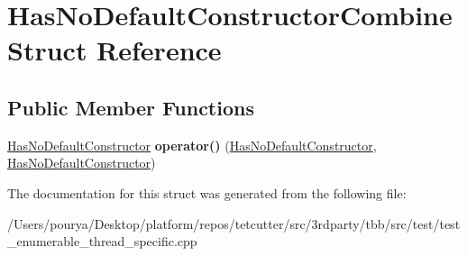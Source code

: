 \hypertarget{structHasNoDefaultConstructorCombine}{}\section{Has\+No\+Default\+Constructor\+Combine Struct Reference}
\label{structHasNoDefaultConstructorCombine}
\subsection*{Public Member Functions}
\begin{DoxyCompactItemize}
\item 
\hypertarget{structHasNoDefaultConstructorCombine_af7df6a0ef07191debb0e70a837667ac1}{}\hyperlink{classHasNoDefaultConstructor}{Has\+No\+Default\+Constructor} {\bfseries operator()} (\hyperlink{classHasNoDefaultConstructor}{Has\+No\+Default\+Constructor}, \hyperlink{classHasNoDefaultConstructor}{Has\+No\+Default\+Constructor})\label{structHasNoDefaultConstructorCombine_af7df6a0ef07191debb0e70a837667ac1}

\end{DoxyCompactItemize}


The documentation for this struct was generated from the following file\+:\begin{DoxyCompactItemize}
\item 
/\+Users/pourya/\+Desktop/platform/repos/tetcutter/src/3rdparty/tbb/src/test/test\+\_\+enumerable\+\_\+thread\+\_\+specific.\+cpp\end{DoxyCompactItemize}
